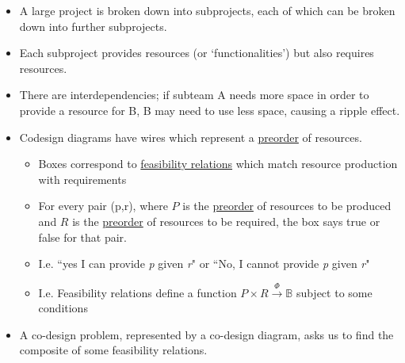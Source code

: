 \begin{itemize}
    \item A large project is broken down into subprojects, each of which can be broken down into further subprojects.
    \item Each subproject provides resources (or `functionalities') but also requires resources.
    \item There are interdependencies; if subteam A needs more space in order to provide a resource for B, B may need to use less space, causing a ripple effect.
    \item Codesign diagrams have wires which represent a \href{doc/1 math/Seven Sketches in Compositionality/Chapter 1: Generative Effects/3 Preorders/1 Preorder}{preorder} of resources.
          \begin{itemize}
            \item Boxes correspond to \href{doc/1 math/Seven Sketches in Compositionality/Chapter 4: Co-design/2 Enriched profunctors/1 Feasibility relationships as Bool-profunctors/1 Feasilibiliy relation}{feasibility relations} which match resource production with requirements
            \item For every pair (p,r), where $P$ is the \href{doc/1 math/Seven Sketches in Compositionality/Chapter 1: Generative Effects/3 Preorders/1 Preorder}{preorder} of resources to be produced and $R$ is the \href{doc/1 math/Seven Sketches in Compositionality/Chapter 1: Generative Effects/3 Preorders/1 Preorder}{preorder} of resources to be required, the box says true or false for that pair.
            \item I.e. ``yes I can provide \emph{p} given \emph{r}" or ``No, I cannot provide \emph{p} given \emph{r}"
            \item I.e. Feasibility relations define a function $P \times  R \xrightarrow{\Phi}\mathbb{B}$ subject to some conditions
          \end{itemize}
    \item A co-design problem, represented by a co-design diagram, asks us to find the composite of some feasibility relations.
          \begin{center}


\end{center}
\end{itemize}
